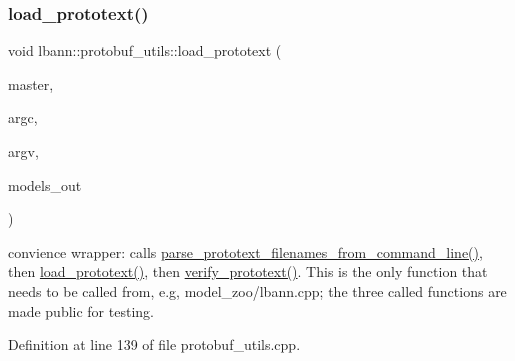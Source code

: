 \subsubsection{\texorpdfstring{load\+\_\+prototext()}{load\_prototext()}}
{\footnotesize\ttfamily void lbann\+::protobuf\+\_\+utils\+::load\+\_\+prototext (\begin{DoxyParamCaption}\item[{const bool}]{master,  }\item[{const int}]{argc,  }\item[{char $\ast$$\ast$}]{argv,  }\item[{std\+::vector$<$ lbann\+\_\+data\+::\+Lbann\+PB $\ast$$>$ \&}]{models\+\_\+out }\end{DoxyParamCaption})\hspace{0.3cm}{\ttfamily [static]}}

convience wrapper\+: calls \hyperlink{classlbann_1_1protobuf__utils_a690c56a9ac8bcbc883751355b53e0006}{parse\+\_\+prototext\+\_\+filenames\+\_\+from\+\_\+command\+\_\+line()}, then \hyperlink{classlbann_1_1protobuf__utils_ad85c0f279c98fad3f9e9e6c54786acf1}{load\+\_\+prototext()}, then \hyperlink{classlbann_1_1protobuf__utils_a058d524e15fb811e0d193ffb308c5faf}{verify\+\_\+prototext()}. This is the only function that needs to be called from, e.\+g, model\+\_\+zoo/lbann.\+cpp; the three called functions are made public for testing. 

Definition at line 139 of file protobuf\+\_\+utils.\+cpp.


